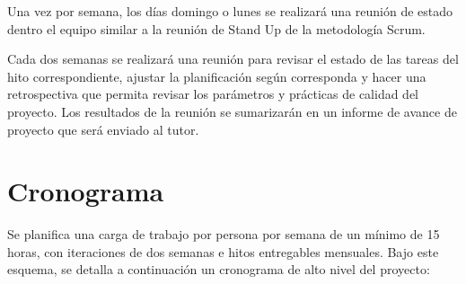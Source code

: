 \documentclass[a4paper,11pt]{article}
\begin{document}
Una vez por semana, los días domingo o lunes se realizará una reunión de estado
dentro el equipo similar a la reunión de Stand Up de la metodología Scrum.

Cada dos semanas se realizará una reunión para revisar el estado de las tareas
del hito correspondiente, ajustar la planificación según corresponda y hacer
una retrospectiva que permita revisar los parámetros y prácticas de calidad del
proyecto. Los resultados de la reunión se sumarizarán en un informe de avance
de proyecto que será enviado al tutor.

\section{Cronograma}

Se planifica una carga de trabajo por persona por semana de un mínimo de 15
horas, con iteraciones de dos semanas e hitos entregables mensuales. Bajo este
esquema, se detalla a continuación un cronograma de alto nivel del proyecto:
\end{document}
